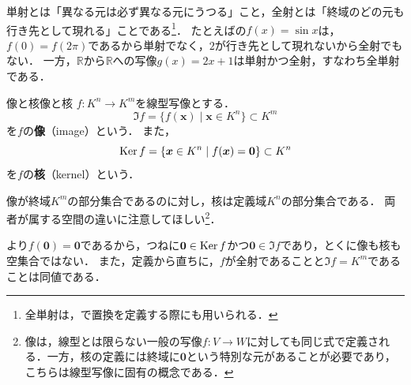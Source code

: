 単射とは「異なる元は必ず異なる元にうつる」こと，全射とは「終域のどの元も行き先として現れる」ことである\footnote{全単射は，で置換を定義する際にも用いられる．}．
たとえばの$f(x) = \sin x$は，$f(0) = f(2\pi)$であるから単射でなく，$2$が行き先として現れないから全射でもない．
一方，$\mathbb{R}$から$\mathbb{R}$への写像$g(x) = 2x + 1$は単射かつ全射，すなわち全単射である．


\begin{definition}{像と核}{像と核}
  $f \colon K^n \to K^m$を線型写像とする．
  \[
    \Im f = \{ f(\bm{x}) \mid \bm{x} \in K^n \} \subset K^m
  \]
  を$f$の\textbf{像}（image）という．
  また，
  \[
    \operatorname{Ker} f = \{ \bm{x} \in K^n \mid f(\bm{x}) = \bm{0} \} \subset K^n
  \]
  を$f$の\textbf{核}（kernel）という．
\end{definition}

像が終域$K^m$の部分集合であるのに対し，核は定義域$K^n$の部分集合である．
両者が属する空間の違いに注意してほしい\footnote{像は，線型とは限らない一般の写像$f \colon V \to W$に対しても同じ式で定義される．一方，核の定義には終域に$\bm{0}$という特別な元があることが必要であり，こちらは線型写像に固有の概念である．}．

より$f(\bm{0}) = \bm{0}$であるから，つねに$\bm{0} \in \operatorname{Ker} f$かつ$\bm{0} \in \Im f$であり，とくに像も核も空集合ではない．
また，定義から直ちに，$f$が全射であることと$\Im f = K^m$であることは同値である．

